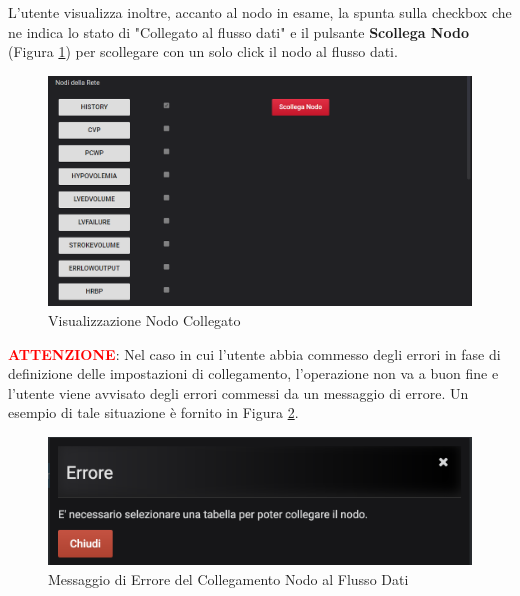 L'utente visualizza inoltre, accanto al nodo in esame, la spunta sulla checkbox che ne indica lo stato di "Collegato al flusso dati" e il pulsante \textbf{Scollega Nodo} (Figura \ref{NodoCollegato}) per scollegare con un solo click il nodo al flusso dati.
 
 \begin{figure}[H]
	\begin{center}
		\includegraphics[scale=0.6]{./images/NodoCollegato.png}
		 \caption{Visualizzazione Nodo Collegato}	
		 \label{NodoCollegato}
	\end{center}
\end{figure}

\textbf{\textcolor{red}{ATTENZIONE}}: Nel caso in cui l'utente abbia commesso degli errori in fase di definizione delle impostazioni di collegamento, l'operazione non va a buon fine e l'utente viene avvisato degli errori commessi da un messaggio di errore. Un esempio di tale situazione è fornito in Figura \ref{ErroreCollegamento}.

\begin{figure}[H]
	\begin{center}
		\includegraphics[scale=0.6]{./images/ErroreCollegamento.png}
		 \caption{Messaggio di Errore del Collegamento Nodo al Flusso Dati}	
		 \label{ErroreCollegamento}
	\end{center}
\end{figure}
 